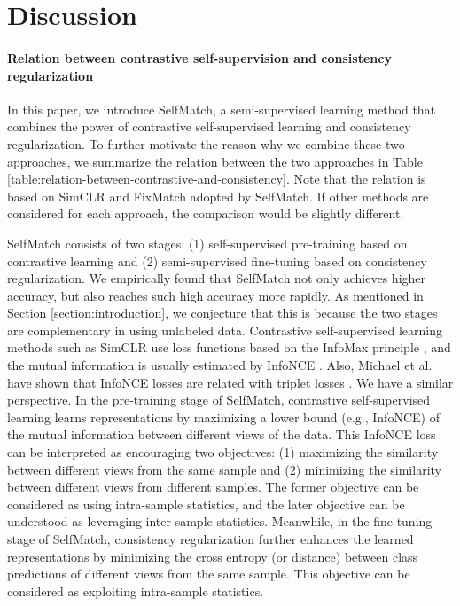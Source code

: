 \documentclass{article}
\begin{document}
\section{Discussion}
\label{app:discussion}

\paragraph{Relation between contrastive self-supervision and consistency regularization}
In this paper, we introduce SelfMatch, a semi-supervised learning method that combines the power of contrastive self-supervised learning and consistency regularization. To further motivate the reason why we combine these two approaches, we summarize the relation between the two approaches in Table \ref{table:relation-between-contrastive-and-consistency}. Note that the relation is based on SimCLR \cite{chen2020simple} and FixMatch \cite{sohn2020fixmatch} adopted by SelfMatch. If other methods are considered for each approach, the comparison would be slightly different.

SelfMatch consists of two stages: (1) self-supervised pre-training based on contrastive learning and (2) semi-supervised fine-tuning based on consistency regularization. We empirically found that SelfMatch not only achieves higher accuracy, but also reaches such high accuracy more rapidly. As mentioned in Section \ref{section:introduction}, we conjecture that this is because the two stages are complementary in using unlabeled data. Contrastive self-supervised learning methods such as SimCLR \cite{chen2020simple} use loss functions based on the InfoMax principle \cite{linsker1988self}, and the mutual information is usually estimated by InfoNCE \cite{oord2018representation}. Also, Michael et al. \cite{tschannen2020mutual} have shown that InfoNCE losses are related with triplet losses \cite{sohn2016improved}. We have a similar perspective. In the pre-training stage of SelfMatch, contrastive self-supervised learning learns representations by maximizing a lower bound (e.g., InfoNCE) of the mutual information between different views of the data. This InfoNCE loss can be interpreted as encouraging two objectives: (1) maximizing the similarity between different views from the same sample and (2) minimizing the similarity between different views from different samples. The former objective can be considered as using intra-sample statistics, and the later objective can be understood as leveraging inter-sample statistics. Meanwhile, in the fine-tuning stage of SelfMatch, consistency regularization \cite{sohn2020fixmatch} further enhances the learned representations by minimizing the cross entropy (or distance) between class predictions of different views from the same sample. This objective can be considered as exploiting intra-sample statistics. 
\end{document}
